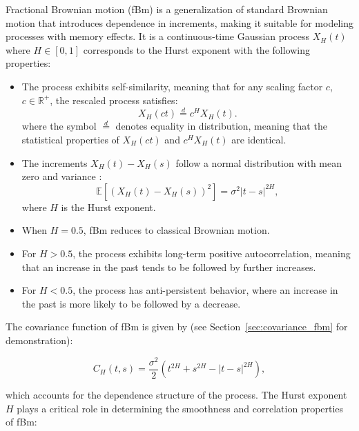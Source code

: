 \documentclass[11pt]{extarticle}
\begin{document}
Fractional Brownian motion (fBm) is a generalization of standard Brownian motion that introduces dependence in increments,
making it suitable for modeling processes with memory effects. It is a continuous-time Gaussian process \( X_H(t) \)
where \( H \in [0, 1] \)  corresponds to the Hurst exponent with the following properties:

\begin{itemize}
    \item The process exhibits self-similarity, meaning that for any scaling factor \( c \), \( c \in \mathbb{R}^+ \), the rescaled process satisfies:
    \begin{equation}
        X_H(ct) \overset{d}{=} c^H X_H(t).
    \end{equation}
    where the symbol \(\stackrel{d}{=}\) denotes equality in distribution, meaning that the statistical properties of \(X_H(ct)\) and \(c^H X_H(t)\) are identical.

    \item The increments \( X_H(t) - X_H(s) \) follow a normal distribution with mean zero and variance :
    \begin{equation}
        \mathbb{E} \left[ (X_H(t) - X_H(s))^2 \right] = \sigma^2|t - s|^{2H},
    \end{equation}
    where \( H \) is the Hurst exponent.

    \item When \( H = 0.5 \), fBm reduces to classical Brownian motion.
    \item For \( H > 0.5 \), the process exhibits long-term positive autocorrelation, meaning that an increase in the past tends to be followed by further increases.
    \item For \( H < 0.5 \), the process has anti-persistent behavior, where an increase in the past is more likely to be followed by a decrease.
\end{itemize}

The covariance function of fBm is given by (see Section~\ref{sec:covariance_fbm} for demonstration):

\begin{equation}
    C_H(t, s) = \frac{\sigma^2}{2} \left( t^{2H} + s^{2H} - |t - s|^{2H} \right),
    \label{eq:fbm_covariance}
\end{equation}

which accounts for the dependence structure of the process. The Hurst exponent \( H \) plays a critical role in determining the smoothness and correlation properties of fBm:
\end{document}
